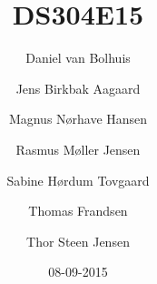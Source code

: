 

\title{DS304E15}
\author{Daniel van Bolhuis \and Jens Birkbak Aagaard \and Magnus Nørhave Hansen \and Rasmus Møller Jensen \and Sabine Hørdum Tovgaard\and Thomas Frandsen \and Thor Steen Jensen}
\date{08-09-2015}



\frontmatter

\maketitle





\tableofcontents

\mainmatter



















